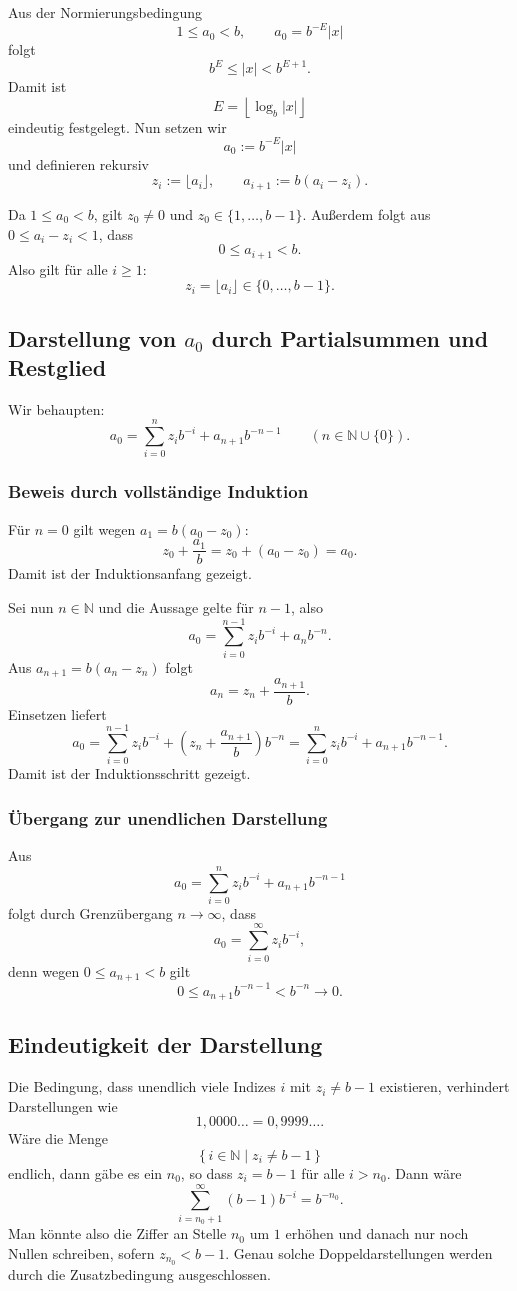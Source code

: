 \documentclass{article}
\newcommand{\N}{\mathbb{N}}
\begin{document}
Aus der Normierungsbedingung
\[
1\leq a_0<b,
\qquad
a_0=b^{-E}|x|
\]
folgt
\[
b^E\leq |x|<b^{E+1}.
\]
Damit ist
\[
E=\left\lfloor\log_b |x|\right\rfloor
\]
eindeutig festgelegt. Nun setzen wir
\[
a_0:=b^{-E}|x|
\]
und definieren rekursiv
\[
z_i:=\lfloor a_i\rfloor,
\qquad
a_{i+1}:=b(a_i-z_i).
\]

Da \(1\leq a_0<b\), gilt \(z_0\neq 0\) und \(z_0\in\{1,\dots,b-1\}\). Außerdem folgt aus \(0\leq a_i-z_i<1\), dass
\[
0\leq a_{i+1}<b.
\]
Also gilt für alle \(i\geq 1\):
\[
z_i=\lfloor a_i\rfloor\in\{0,\dots,b-1\}.
\]

\subsection*{Darstellung von \(a_0\) durch Partialsummen und Restglied}

Wir behaupten:
\[
a_0=
\sum_{i=0}^{n}z_i b^{-i}
+
a_{n+1}b^{-n-1}
\qquad
(n\in\N\cup\{0\}).
\]

\subsubsection*{Beweis durch vollständige Induktion}

Für \(n=0\) gilt wegen \(a_1=b(a_0-z_0)\):
\[
z_0+\frac{a_1}{b}
=
z_0+(a_0-z_0)
=a_0.
\]
Damit ist der Induktionsanfang gezeigt.

Sei nun \(n\in\N\) und die Aussage gelte für \(n-1\), also
\[
a_0=
\sum_{i=0}^{n-1}z_i b^{-i}
+
a_n b^{-n}.
\]
Aus \(a_{n+1}=b(a_n-z_n)\) folgt
\[
a_n=z_n+\frac{a_{n+1}}{b}.
\]
Einsetzen liefert
\[
a_0=
\sum_{i=0}^{n-1}z_i b^{-i}
+
\left(z_n+\frac{a_{n+1}}{b}\right)b^{-n}
=
\sum_{i=0}^{n}z_i b^{-i}
+
a_{n+1}b^{-n-1}.
\]
Damit ist der Induktionsschritt gezeigt.

\subsubsection*{Übergang zur unendlichen Darstellung}

Aus
\[
a_0=
\sum_{i=0}^{n}z_i b^{-i}
+
a_{n+1}b^{-n-1}
\]
folgt durch Grenzübergang \(n\to\infty\), dass
\[
a_0=\sum_{i=0}^{\infty}z_i b^{-i},
\]
denn wegen \(0\leq a_{n+1}<b\) gilt
\[
0\leq a_{n+1}b^{-n-1}<b^{-n}\to 0.
\]

\subsection*{Eindeutigkeit der Darstellung}

Die Bedingung, dass unendlich viele Indizes \(i\) mit \(z_i\neq b-1\) existieren, verhindert Darstellungen wie
\[
1{,}0000\ldots=0{,}9999\ldots.
\]
Wäre die Menge
\[
\{\,i\in\N\mid z_i\neq b-1\,\}
\]
endlich, dann gäbe es ein \(n_0\), so dass \(z_i=b-1\) für alle \(i>n_0\). Dann wäre
\[
\sum_{i=n_0+1}^{\infty}(b-1)b^{-i}=b^{-n_0}.
\]
Man könnte also die Ziffer an Stelle \(n_0\) um \(1\) erhöhen und danach nur noch Nullen schreiben, sofern \(z_{n_0}<b-1\). Genau solche Doppeldarstellungen werden durch die Zusatzbedingung ausgeschlossen.
\end{document}
